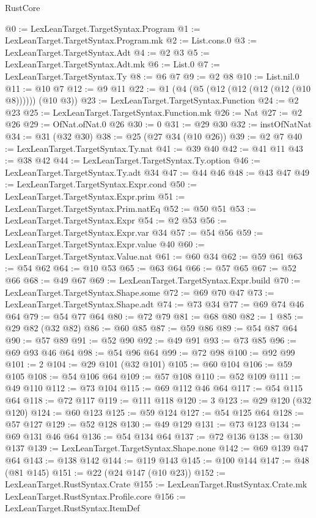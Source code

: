 \begin{lexlean}{RustCore}
\begin{coremodule}
@0 := LexLeanTarget.TargetSyntax.Program
@1 := LexLeanTarget.TargetSyntax.Program.mk
@2 := List.cons.{0}
@3 := LexLeanTarget.TargetSyntax.Adt
@4 := @2 @3
@5 := LexLeanTarget.TargetSyntax.Adt.mk
@6 := List.{0}
@7 := LexLeanTarget.TargetSyntax.Ty
@8 := @6 @7
@9 := @2 @8
@10 := List.nil.{0}
@11 := @10 @7
@12 := @9 @11
@22 := @1 (@4 (@5 (@12 (@12 (@12 (@12 (@10 @8)))))) (@10 @3))
@23 := LexLeanTarget.TargetSyntax.Function
@24 := @2 @23
@25 := LexLeanTarget.TargetSyntax.Function.mk
@26 := Nat
@27 := @2 @26
@29 := OfNat.ofNat.{0} @26
@30 := 0
@31 := @29 @30
@32 := instOfNatNat
@34 := @31 (@32 @30)
@38 := @25 (@27 @34 (@10 @26))
@39 := @2 @7
@40 := LexLeanTarget.TargetSyntax.Ty.nat
@41 := @39 @40
@42 := @41 @11
@43 := @38 @42
@44 := LexLeanTarget.TargetSyntax.Ty.option
@46 := LexLeanTarget.TargetSyntax.Ty.adt @34
@47 := @44 @46
@48 := @43 @47
@49 := LexLeanTarget.TargetSyntax.Expr.cond
@50 := LexLeanTarget.TargetSyntax.Expr.prim
@51 := LexLeanTarget.TargetSyntax.Prim.natEq
@52 := @50 @51
@53 := LexLeanTarget.TargetSyntax.Expr
@54 := @2 @53
@56 := LexLeanTarget.TargetSyntax.Expr.var @34
@57 := @54 @56
@59 := LexLeanTarget.TargetSyntax.Expr.value @40
@60 := LexLeanTarget.TargetSyntax.Value.nat
@61 := @60 @34
@62 := @59 @61
@63 := @54 @62
@64 := @10 @53
@65 := @63 @64
@66 := @57 @65
@67 := @52 @66
@68 := @49 @67
@69 := LexLeanTarget.TargetSyntax.Expr.build
@70 := LexLeanTarget.TargetSyntax.Shape.some
@72 := @69 @70 @47
@73 := LexLeanTarget.TargetSyntax.Shape.adt
@74 := @73 @34
@77 := @69 @74 @46 @64
@79 := @54 @77 @64
@80 := @72 @79
@81 := @68 @80
@82 := 1
@85 := @29 @82 (@32 @82)
@86 := @60 @85
@87 := @59 @86
@89 := @54 @87 @64
@90 := @57 @89
@91 := @52 @90
@92 := @49 @91
@93 := @73 @85
@96 := @69 @93 @46 @64
@98 := @54 @96 @64
@99 := @72 @98
@100 := @92 @99
@101 := 2
@104 := @29 @101 (@32 @101)
@105 := @60 @104
@106 := @59 @105
@108 := @54 @106 @64
@109 := @57 @108
@110 := @52 @109
@111 := @49 @110
@112 := @73 @104
@115 := @69 @112 @46 @64
@117 := @54 @115 @64
@118 := @72 @117
@119 := @111 @118
@120 := 3
@123 := @29 @120 (@32 @120)
@124 := @60 @123
@125 := @59 @124
@127 := @54 @125 @64
@128 := @57 @127
@129 := @52 @128
@130 := @49 @129
@131 := @73 @123
@134 := @69 @131 @46 @64
@136 := @54 @134 @64
@137 := @72 @136
@138 := @130 @137
@139 := LexLeanTarget.TargetSyntax.Shape.none
@142 := @69 @139 @47 @64
@143 := @138 @142
@144 := @119 @143
@145 := @100 @144
@147 := @48 (@81 @145)
@151 := @22 (@24 @147 (@10 @23))
@152 := LexLeanTarget.RustSyntax.Crate
@155 := LexLeanTarget.RustSyntax.Crate.mk LexLeanTarget.RustSyntax.Profile.core
@156 := LexLeanTarget.RustSyntax.ItemDef

\end{coremodule}
\end{lexlean}
